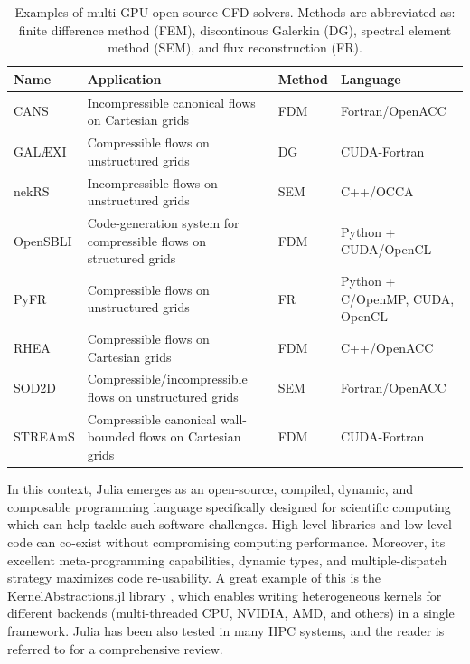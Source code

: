 \documentclass[final,3p,times]{elsarticle}
\begin{document}
\begin{table}[!ht]
\hspace{-1.5cm}
\begin{tabular}{ l  l  l  l}
    \hline
    \multicolumn{1}{l}{\textbf{Name}} & \multicolumn{1}{l}{\textbf{Application}} & \multicolumn{1}{l}{\textbf{Method}} & \multicolumn{1}{l}{\textbf{Language}} \\
    \hline\hline
    CANS \cite{Costa2018} & Incompressible canonical flows on Cartesian grids & FDM & Fortran/OpenACC \\
    GAL{\AE}XI \cite{Kempf2024} & Compressible flows on unstructured grids & DG & CUDA-Fortran \\
    nekRS \cite{Fischer2022} & Incompressible flows on unstructured grids & SEM & C++/OCCA \\
    OpenSBLI \cite{Lusher2021} & Code-generation system for compressible flows on structured grids & FDM & Python + CUDA/OpenCL \\
    PyFR \cite{Witherden2015} & Compressible flows on unstructured grids & FR & Python + C/OpenMP, CUDA, OpenCL \\
    RHEA \cite{Jofre2023} & Compressible flows on Cartesian grids & FDM & C++/OpenACC \\
    SOD2D \cite{Gasparino2024} & Compressible/incompressible flows on unstructured grids & SEM & Fortran/OpenACC \\
    STREAmS \cite{Bernardini2021} & Compressible canonical wall-bounded flows on Cartesian grids & FDM & CUDA-Fortran \\
    \hline
\end{tabular}\label{tab:solvers}
\caption{Examples of multi-GPU open-source CFD solvers. Methods are abbreviated as: finite difference method (FEM), discontinous Galerkin (DG), spectral element method (SEM), and flux reconstruction (FR).}
\end{table}

In this context, Julia \cite{Bezanson2017} emerges as an open-source, compiled, dynamic, and composable programming language specifically designed for scientific computing which can help tackle such software challenges. High-level libraries and low level code can co-exist without compromising computing performance. Moreover, its excellent meta-programming capabilities, dynamic types, and multiple-dispatch strategy maximizes code re-usability. A great example of this is the KernelAbstractions.jl library \cite{Churavy2023}, which enables writing heterogeneous kernels for different backends (multi-threaded CPU, NVIDIA, AMD, and others) in a single framework.
Julia has been also tested in many HPC systems, and the reader is referred to \cite{Churavy2022} for a comprehensive review.
\end{document}

